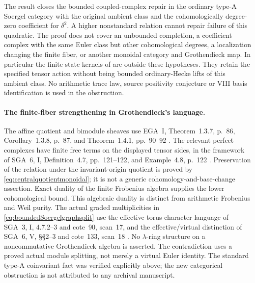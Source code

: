 The result closes the bounded coupled-complex repair in
the ordinary type-A Soergel category with the original
ambient class and the cohomologically degree-zero
coefficient for \(\delta^2\). A higher nonstandard
relation cannot repair failure of this quadratic.
The proof does not cover an unbounded completion, a
coefficient complex with the same Euler class but other
cohomological degrees, a localization changing the finite
fiber, or another monoidal category and Grothendieck map.
In particular the finite-state kernels of  are
outside these hypotheses. They retain the specified
tensor action without being bounded ordinary-Hecke
lifts of this ambient class. No arithmetic trace law,
source positivity conjecture or VIII basis identification
is used in the obstruction.

\paragraph{The finite-fiber strengthening in Grothendieck's language.}
The affine quotient and bimodule sheaves use EGA~I,
Theorem~1.3.7, p.~86, Corollary~1.3.8, p.~87, and
Theorem~1.4.1, pp.~90--92 \cite{EGA}.
The relevant perfect complexes have finite free terms
on the displayed tensor sides, in the framework of
SGA~6, I, Definition~4.7, pp.~121--122, and
Example~4.8, p.~122 \cite{SGA6}.
Preservation of the relation under the invariant-origin
quotient is proved by
\eqref{eq:centralquotientmonoidal}; it is not a generic
cohomology-and-base-change assertion. Exact duality of
the finite Frobenius algebra supplies the lower
cohomological bound. This algebraic duality is distinct
from arithmetic Frobenius and Weil purity.
The actual graded multiplicities in
\eqref{eq:boundedSoergelgraphsplit} use the effective
torus-character language of SGA~3, I, 4.7.2--3 and
cote~90, scan~17, and the effective/virtual distinction
of SGA~6, V, \S\S2--3 and cote~133, scan~18
\cite{SGA3,SGA6,Archive}.
No \(\lambda\)-ring structure on a noncommutative
Grothendieck algebra is asserted. The contradiction
uses a proved actual module splitting, not merely
a virtual Euler identity. The standard type-A
coinvariant fact was verified explicitly above; the
new categorical obstruction is not attributed to
any archival manuscript.
